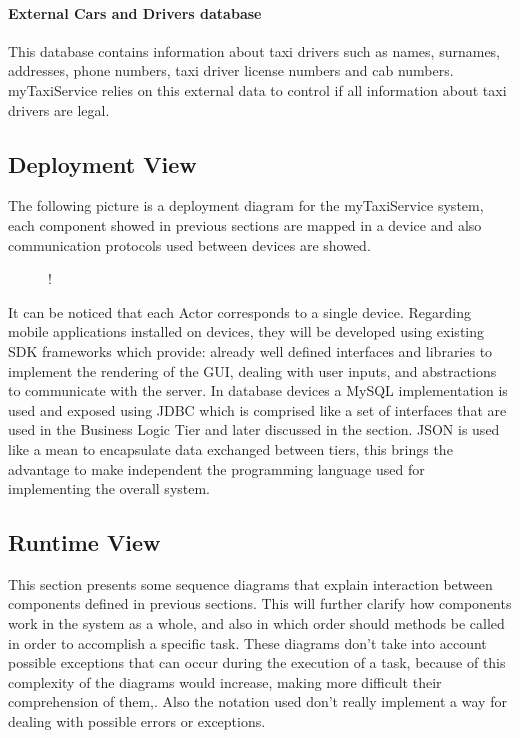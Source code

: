 \paragraph{External Cars and Drivers database}
This database contains information about taxi drivers such as names, surnames, addresses, phone numbers, taxi driver license numbers and cab numbers. myTaxiService relies on this external data to control if all information about taxi drivers are legal.
\subsection{Deployment View}
The following picture is a deployment diagram for the myTaxiService system, each component showed in previous sections are mapped in a device and also communication protocols used between devices are showed.
\begin{figure}[H]
	\centering
	\resizebox{6in}
	{!}{}
\end{figure}
It can be noticed that each Actor corresponds to a single device. Regarding mobile applications installed on devices, they will be developed using existing SDK frameworks which provide: already well defined interfaces and libraries to implement the rendering of the GUI, dealing with user inputs, and abstractions to communicate with the server. \newline
In database devices a MySQL implementation is used and exposed using JDBC which is comprised like a set of interfaces that are used in the Business Logic Tier and later discussed in the  section. \newline
JSON is used like a mean to encapsulate data exchanged between tiers, this brings the advantage to make independent the programming language used for implementing the overall system. 
\subsection{Runtime View}
This section presents some sequence diagrams that explain interaction between components defined in previous sections. This will further clarify how components work in the system as a whole, and also in which order should methods be called in order to accomplish a specific task. \newline
These diagrams don't take into account possible exceptions that can occur during the execution of a task, because of this complexity of the diagrams would increase, making more difficult their comprehension of them,. Also the notation used don't really implement a way for dealing with possible errors or exceptions.
